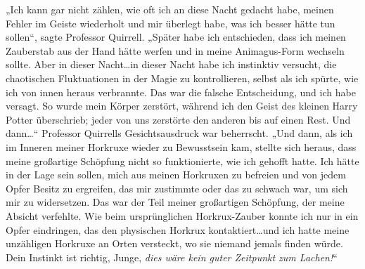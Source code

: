 „Ich kann gar nicht zählen, wie oft ich an diese Nacht gedacht habe, meinen Fehler im Geiste wiederholt und mir überlegt habe, was ich besser hätte tun sollen“, sagte Professor Quirrell. „Später habe ich entschieden, dass ich meinen Zauberstab aus der Hand hätte werfen und in meine Animagus-Form wechseln sollte. Aber in dieser Nacht…in dieser Nacht habe ich instinktiv versucht, die chaotischen Fluktuationen in der Magie zu kontrollieren, selbst als ich spürte, wie ich von innen heraus verbrannte. Das war die falsche Entscheidung, und ich habe versagt. So wurde mein Körper zerstört, während ich den Geist des kleinen Harry Potter überschrieb; jeder von uns zerstörte den anderen bis auf einen Rest. Und dann…“
Professor Quirrells Gesichtsausdruck war beherrscht.
„Und dann, als ich im Inneren meiner Horkruxe wieder zu Bewusstsein kam, stellte sich heraus, dass meine großartige Schöpfung nicht so funktionierte, wie ich gehofft hatte. Ich hätte in der Lage sein sollen, mich aus meinen Horkruxen zu befreien und von jedem Opfer Besitz zu ergreifen, das mir zustimmte oder das zu schwach war, um sich mir zu widersetzen. Das war der Teil meiner großartigen Schöpfung, der meine Absicht verfehlte. Wie beim ursprünglichen Horkrux-Zauber konnte ich nur in ein Opfer eindringen, das den physischen Horkrux kontaktiert…und ich hatte meine unzähligen Horkruxe an Orten versteckt, wo sie niemand jemals finden würde. Dein Instinkt ist richtig, Junge, \emph{dies wäre kein guter Zeitpunkt zum Lachen!}“

